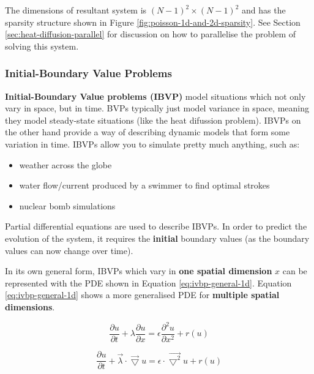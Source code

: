 \documentclass{article}
\begin{document}
The dimensions of resultant system is $(N - 1)^2 \times (N - 1)^2$ and has the sparsity structure shown in Figure \ref{fig:poisson-1d-and-2d-sparsity}. See Section \ref{sec:heat-diffusion-parallel} for discussion on how to parallelise the problem of solving this system.

\subsubsection{Initial-Boundary Value Problems}

\textbf{Initial-Boundary Value problems (IBVP)} model situations which not only vary in space, but in time. BVPs typically just model variance in space, meaning they model steady-state situations (like the heat difussion problem). IBVPs on the other hand provide a way of describing dynamic models that form some variation in time. IBVPs allow you to simulate pretty much anything, such as:
\begin{itemize}
	\item weather across the globe
	\item water flow/current produced by a swimmer to find optimal strokes
	\item nuclear bomb simulations
\end{itemize}

Partial differential equations are used to describe IBVPs. In order to predict the evolution of the system, it requires the \textbf{initial} boundary values (as the boundary values can now change over time).

In its own general form, IBVPs which vary in \textbf{one spatial dimension} $x$ can be represented with the PDE shown in Equation \ref{eq:ivbp-general-1d}. Equation \ref{eq:ivbp-general-1d} shows a more generalised PDE for \textbf{multiple spatial dimensions}.

\begin{equation}
	\frac{\partial u}{\partial t} + \lambda\frac{\partial u}{\partial x} = \epsilon \frac{\partial^2 u}{\partial x^2} + r(u)
	\label{eq:ivbp-general-1d}
\end{equation}

\begin{equation}
	\frac{\partial u}{\partial t} + \vec{\lambda} \cdot \vec{\bigtriangledown}u = \epsilon \cdot \vec{\bigtriangledown^2}u + r(u)
	\label{eq:ivbp-general-multid}
\end{equation}
\end{document}

